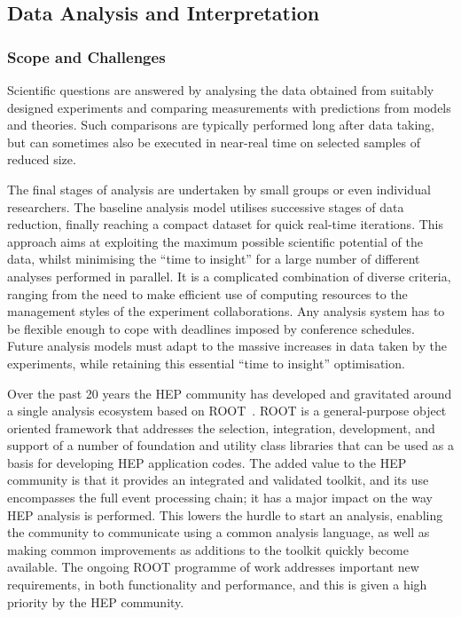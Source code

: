 \hypertarget{data-analysis-and-interpretation}{%
\subsection{Data Analysis and
Interpretation}\label{data-analysis-and-interpretation}}

\subsubsection*{Scope and Challenges}

Scientific questions are answered by analysing the data obtained from
suitably designed experiments and comparing measurements with
predictions from models and theories. Such comparisons are typically
performed long after data taking, but can sometimes also be executed in
near-real time on selected samples of reduced size.

The final stages of analysis are undertaken by small groups or even
individual researchers. The baseline analysis model utilises successive
stages of data reduction, finally reaching a compact dataset for quick
real-time iterations. This approach aims at exploiting the maximum
possible scientific potential of the data, whilst minimising the ``time
to insight'' for a large number of different analyses performed in
parallel. It is a complicated combination of diverse criteria, ranging
from the need to make efficient use of computing resources to the
management styles of the experiment collaborations. Any analysis system
has to be flexible enough to cope with deadlines imposed by conference
schedules. Future analysis models must adapt to the massive increases in
data taken by the experiments, while retaining this essential ``time to
insight'' optimisation.

Over the past 20 years the HEP community has developed and gravitated
around a single analysis ecosystem based on ROOT~\cite{Brun1996}.
ROOT is a general-purpose object
oriented framework that addresses the selection, integration,
development, and support of a number of foundation and utility class
libraries that can be used as a basis for developing HEP application
codes. The added value to the HEP community is that it provides an
integrated and validated toolkit, and its use encompasses the full event
processing chain; it has a major impact on the way HEP analysis is
performed. This lowers the hurdle to start an analysis, enabling the
community to communicate using a common analysis language, as well as
making common improvements as additions to the toolkit quickly become
available. The ongoing ROOT programme of work addresses important new
requirements, in both functionality and performance, and this is given
a high priority by the HEP community.

